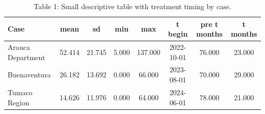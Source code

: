 \begin{table}[ht]
\centering
\caption{Table 1: Small descriptive table with treatment timing by case.}
\label{tab:descriptive_table}
\begin{tabular}{l c c c c c c c}
\hline
Case & mean & sd & min & max & t begin & pre t months & t months \\
\hline
Arauca Department & 52.414 & 21.745 & 5.000 & 137.000 & 2022-10-01 & 76.000 & 23.000 \\
Buenaventura & 26.182 & 13.692 & 0.000 & 66.000 & 2023-08-01 & 70.000 & 29.000 \\
Tumaco Region & 14.626 & 11.976 & 0.000 & 64.000 & 2024-06-01 & 78.000 & 21.000 \\
\hline
\end{tabular}
\end{table}
